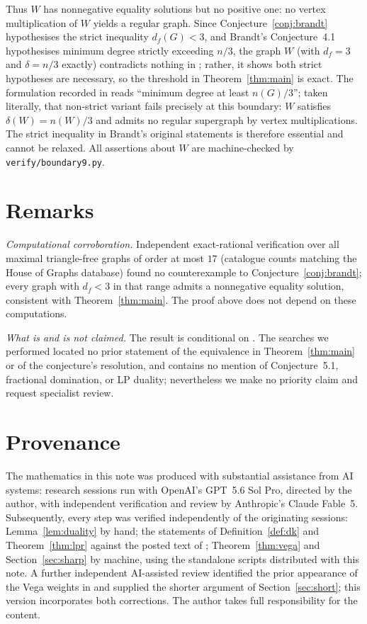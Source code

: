 \documentclass[11pt]{article}
\theoremstyle{definition}
\theoremstyle{remark}
\newcommand{\df}{d_f}
\begin{document}
Thus $W$ has nonnegative equality solutions but no positive one: no vertex multiplication of
$W$ yields a regular graph. Since Conjecture~\ref{conj:brandt} hypothesises the strict
inequality $\df(G)<3$, and Brandt's Conjecture~4.1 hypothesises minimum degree strictly
exceeding $n/3$, the graph $W$ (with $\df=3$ and $\delta=n/3$ exactly) contradicts nothing
in \cite{Brandt2002}; rather, it shows both strict hypotheses are necessary, so the
threshold in Theorem~\ref{thm:main} is exact. The formulation recorded in \cite{WestPage}
reads ``minimum degree at least $n(G)/3$''; taken literally, that non-strict variant fails
precisely at this boundary: $W$ satisfies $\delta(W)=n(W)/3$ and admits no regular
supergraph by vertex multiplications. The strict inequality in Brandt's original
statements is therefore essential and cannot be relaxed.
All assertions about $W$ are machine-checked by \texttt{verify/boundary9.py}.

\section{Remarks}

\emph{Computational corroboration.} Independent exact-rational verification over all
maximal triangle-free graphs of order at most $17$ (catalogue counts matching the House of
Graphs database) found no counterexample to Conjecture~\ref{conj:brandt}; every graph with
$\df<3$ in that range admits a nonnegative equality solution, consistent with
Theorem~\ref{thm:main}. The proof above does not depend on these computations.

\emph{What is and is not claimed.} The result is conditional on \cite{LPR}. The searches we
performed located no prior statement of the equivalence in Theorem~\ref{thm:main} or of the
conjecture's resolution, and \cite{LPR} contains no mention of Conjecture~5.1, fractional
domination, or LP duality; nevertheless we make no priority claim and request specialist
review.

\section{Provenance}\label{sec:provenance}

The mathematics in this note was produced with substantial assistance from AI systems:
research sessions run with OpenAI's GPT~5.6 Sol Pro, directed by the author, with
independent verification and review by Anthropic's Claude Fable~5. Subsequently, every
step was verified independently of the originating sessions: Lemma~\ref{lem:duality} by
hand; the statements of Definition~\ref{def:dk} and Theorem~\ref{thm:lpr} against the
posted text of \cite{LPR}; Theorem~\ref{thm:vega} and Section~\ref{sec:sharp} by machine,
using the standalone scripts distributed with this note. A further independent AI-assisted
review identified the prior appearance of the Vega weights in \cite{BT,BP,LPR2021} and
supplied the shorter argument of Section~\ref{sec:short}; this version incorporates both
corrections. The author takes full responsibility for the content.
\end{document}
